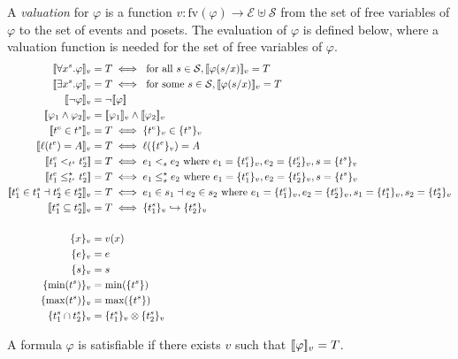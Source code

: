 A \emph{valuation} for $\varphi$ is a function
$v:\text{fv}(\varphi)\to\mathcal{E}\uplus\mathcal{S}$
from the set of free variables of $\varphi$ to the set of events and posets.
%
The evaluation of $\varphi$ is defined below, where a valuation function is needed for the set of free variables of $\varphi$.
\begin{align*}
  \enc{\forall x^s.\varphi}_{v} &= T \iff\text{ for all }s\in\mathcal{S}, \enc{\varphi(s/x)}_{v} = T\\
  \enc{\exists x^s.\varphi}_{v} &= T \iff\text{ for some }s\in\mathcal{S}, \enc{\varphi(s/x)}_{v} = T\\
  \enc{\neg\varphi}_v &= \neg\enc{\varphi} \\
  \enc{\varphi_1\wedge\varphi_2}_v &= \enc{\varphi_1}_v\wedge\enc{\varphi_2}_v\\
  \enc{t^e\in t^s}_v &= T\iff\enct{t^e}_v\in\enct{t^s}_v\\
  \enc{\labl(t^e) = A}_v &= T\iff\labl(\enct{t^e}_v)=A\\
  \enc{t^e_1 <_{t^s} t^e_2} &= T\iff e_1 <_s e_2\text{ where }e_1 = \enct{t^e_1}_v,e_2 = \enct{t^e_2}_v,s = \enct{t^s}_v\\
  \enc{t^e_1 \tleq_{t^s} t^e_2} &= T\iff e_1 \tleq_s e_2\text{ where }e_1 = \enct{t^e_1}_v,e_2 = \enct{t^e_2}_v,s = \enct{t^s}_v\\
  \enc{t^e_1\in t^s_1 \dashv t^e_2\in t^s_2}_v &= T\iff e_1\in s_1 \dashv e_2\in s_2\text{ where }
  e_1 = \enct{t^e_1}_v,e_2 = \enct{t^e_2}_v,s_1 = \enct{t^s_1}_v,s_2 = \enct{t^s_2}_v\\
  \enc{t^s_1\subseteq t^s_2}_v &= T\iff\enct{t^s_1}_v\emb \enct{t^s_2}_v\\
  \\
  \enct{x}_{v} &= v(x)\\
  \enct{e}_{v} &= e\\
  \enct{s}_{v} &= s\\
  \enct{\text{min}(t^s)}_{v} &= \text{min}(\enct{t^s})\\
  \enct{\text{max}(t^s)}_{v} &= \text{max}(\enct{t^s})\\
  \enct{t^s_1 \cap t^s_2}_{v} &= \enct{t^s_1}_v \otimes \enct{t^s_2}_{v}\\
\end{align*}

A formula $\varphi$ is satisfiable if there exists $v$ such that $[\![\varphi]\!]_v = T$.

